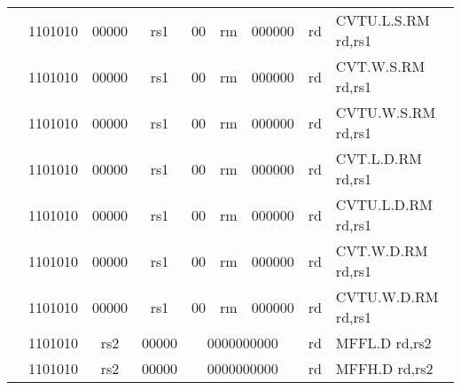 \begin{table}[p]
\begin{small}
\begin{center}
\begin{tabular}{rcccccccccccl}
&
\multicolumn{2}{|c|}{1101010} &
\multicolumn{1}{c|}{00000} &
\multicolumn{1}{c|}{rs1} &
\multicolumn{1}{c|}{00} &
\multicolumn{2}{c|}{rm} &
\multicolumn{3}{c|}{000000} &
\multicolumn{1}{c|}{rd} & CVTU.L.S.RM rd,rs1 \\
\cline{2-12}
  

&
\multicolumn{2}{|c|}{1101010} &
\multicolumn{1}{c|}{00000} &
\multicolumn{1}{c|}{rs1} &
\multicolumn{1}{c|}{00} &
\multicolumn{2}{c|}{rm} &
\multicolumn{3}{c|}{000000} &
\multicolumn{1}{c|}{rd} & CVT.W.S.RM rd,rs1 \\
\cline{2-12}
  

&
\multicolumn{2}{|c|}{1101010} &
\multicolumn{1}{c|}{00000} &
\multicolumn{1}{c|}{rs1} &
\multicolumn{1}{c|}{00} &
\multicolumn{2}{c|}{rm} &
\multicolumn{3}{c|}{000000} &
\multicolumn{1}{c|}{rd} & CVTU.W.S.RM rd,rs1 \\
\cline{2-12}
  

&
\multicolumn{2}{|c|}{1101010} &
\multicolumn{1}{c|}{00000} &
\multicolumn{1}{c|}{rs1} &
\multicolumn{1}{c|}{00} &
\multicolumn{2}{c|}{rm} &
\multicolumn{3}{c|}{000000} &
\multicolumn{1}{c|}{rd} & CVT.L.D.RM rd,rs1 \\
\cline{2-12}
  

&
\multicolumn{2}{|c|}{1101010} &
\multicolumn{1}{c|}{00000} &
\multicolumn{1}{c|}{rs1} &
\multicolumn{1}{c|}{00} &
\multicolumn{2}{c|}{rm} &
\multicolumn{3}{c|}{000000} &
\multicolumn{1}{c|}{rd} & CVTU.L.D.RM rd,rs1 \\
\cline{2-12}
  

&
\multicolumn{2}{|c|}{1101010} &
\multicolumn{1}{c|}{00000} &
\multicolumn{1}{c|}{rs1} &
\multicolumn{1}{c|}{00} &
\multicolumn{2}{c|}{rm} &
\multicolumn{3}{c|}{000000} &
\multicolumn{1}{c|}{rd} & CVT.W.D.RM rd,rs1 \\
\cline{2-12}
  

&
\multicolumn{2}{|c|}{1101010} &
\multicolumn{1}{c|}{00000} &
\multicolumn{1}{c|}{rs1} &
\multicolumn{1}{c|}{00} &
\multicolumn{2}{c|}{rm} &
\multicolumn{3}{c|}{000000} &
\multicolumn{1}{c|}{rd} & CVTU.W.D.RM rd,rs1 \\
\cline{2-12}
  

&
\multicolumn{2}{|c|}{1101010} &
\multicolumn{1}{c|}{rs2} &
\multicolumn{1}{c|}{00000} &
\multicolumn{6}{c|}{0000000000} &
\multicolumn{1}{c|}{rd} & MFFL.D rd,rs2 \\
\cline{2-12}
  

&
\multicolumn{2}{|c|}{1101010} &
\multicolumn{1}{c|}{rs2} &
\multicolumn{1}{c|}{00000} &
\multicolumn{6}{c|}{0000000000} &
\multicolumn{1}{c|}{rd} & MFFH.D rd,rs2 \\
\cline{2-12}
  


\end{tabular}
\end{center}
\end{small}
\end{table}

